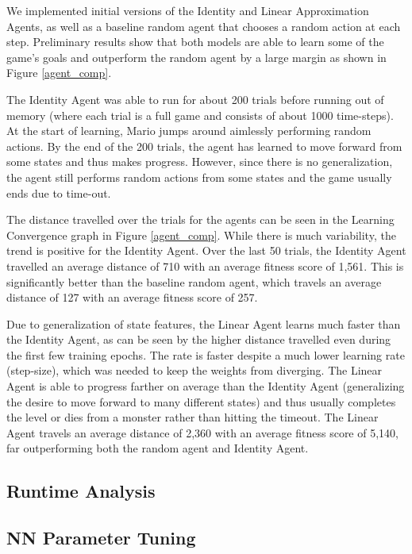 \documentclass[12pt]{article}
\begin{document}
We implemented initial versions of the Identity and Linear Approximation Agents, as well as a baseline random agent that chooses a random action at each step. Preliminary results show that both models are able to learn some of the game's goals and outperform the random agent by a large margin as shown in Figure \ref{agent_comp}.

The Identity Agent was able to run for about 200 trials before running out of memory (where each trial is a full game and consists of about 1000 time-steps). At the start of learning, Mario jumps around aimlessly performing random actions. By the end of the 200 trials, the agent has learned to move forward from some states and thus makes progress. However, since there is no generalization, the agent still performs random actions from some states and the game usually ends due to time-out. 

The distance travelled over the trials for the agents can be seen in the Learning Convergence graph in Figure \ref{agent_comp}. While there is much variability, the trend is positive for the Identity Agent. Over the last 50 trials, the Identity Agent travelled an average distance of 710 with an average fitness score of 1,561. This is significantly better than the baseline random agent, which travels an average distance of 127 with an average fitness score of 257.

Due to generalization of state features, the Linear Agent learns much faster than the Identity Agent, as can be seen by the higher distance travelled even during the first few training epochs. The rate is faster despite a much lower learning rate (step-size), which was needed to keep the weights from diverging. The Linear Agent is able to progress farther on average than the Identity Agent (generalizing the desire to move forward to many different states) and thus usually completes the level or dies from a monster rather than hitting the timeout. The Linear Agent travels an average distance of 2,360 with an average fitness score of 5,140, far outperforming both the random agent and Identity Agent.

\subsection{Runtime Analysis}

\subsection{NN Parameter Tuning}
\end{document}
